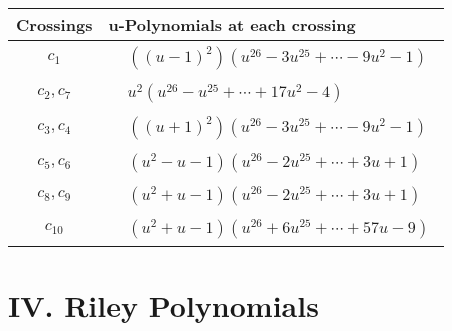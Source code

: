 \documentclass[1p]{elsarticle_modified}
\theoremstyle{definition}
\begin{document}
\begin{tabular}{m{50pt}|m{274pt}}
Crossings & \hspace{64pt}u-Polynomials at each crossing \\
\hline $$\begin{aligned}c_{1}\end{aligned}$$&$\begin{aligned}
&((u-1)^2)(u^{26}-3 u^{25}+\cdots-9 u^2-1)
\end{aligned}$\\
\hline $$\begin{aligned}c_{2},c_{7}\end{aligned}$$&$\begin{aligned}
&u^2(u^{26}- u^{25}+\cdots+17 u^2-4)
\end{aligned}$\\
\hline $$\begin{aligned}c_{3},c_{4}\end{aligned}$$&$\begin{aligned}
&((u+1)^2)(u^{26}-3 u^{25}+\cdots-9 u^2-1)
\end{aligned}$\\
\hline $$\begin{aligned}c_{5},c_{6}\end{aligned}$$&$\begin{aligned}
&(u^2- u-1)(u^{26}-2 u^{25}+\cdots+3 u+1)
\end{aligned}$\\
\hline $$\begin{aligned}c_{8},c_{9}\end{aligned}$$&$\begin{aligned}
&(u^2+u-1)(u^{26}-2 u^{25}+\cdots+3 u+1)
\end{aligned}$\\
\hline $$\begin{aligned}c_{10}\end{aligned}$$&$\begin{aligned}
&(u^2+u-1)(u^{26}+6 u^{25}+\cdots+57 u-9)
\end{aligned}$\\
\hline
\end{tabular}\newpage\renewcommand{\arraystretch}{1}
\centering \section*{ IV. Riley Polynomials}
\end{document}
